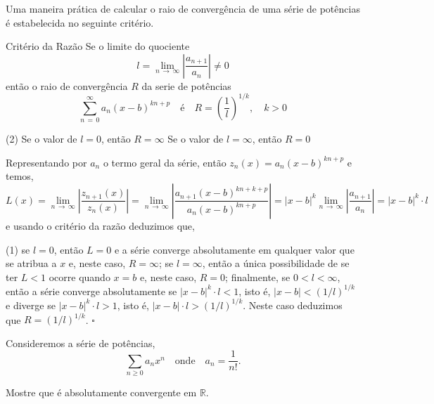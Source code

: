 Uma maneira prática de calcular o raio de convergência de uma série de potências é estabelecida no 
seguinte critério.

\begin{theoc}{Critério da Razão}{}
Se o limite do quociente
\begin{equation*}
l=\lim_{n\, \to\, \infty}\left|\dfrac{a_{n+1}}{a_{n}}\right| \neq 0 
\end{equation*} 
então o raio de convergência \(R\) da serie de potências 
\begin{equation*}
  \sum_{n\, =\, 0}^{\infty}a_{n}(x-b)^{kn+p} \quad\text{é}\quad  R=\left(\dfrac{1}{l}\right)^{1/k}, \quad k >0
\end{equation*}
\begin{tasks}[label=(\alph*),item-indent=3em,label-width=2em,ref=(\alph*)](2)
  \task  Se o valor de \(l=0\), então \(R=\infty\)
  \task Se o valor de \(l = \infty\), então \(R = 0\)
\end{tasks}
\end{theoc}

\begin{prvc}{}{}
Representando por \(a_{n}\) o termo geral da série, então \(z_{n}(x)=a_{n}(x-b)^{kn+p}\) e temos,
\begin{equation*}
L(x)=\lim_{n\, \to\, \infty}\left| \dfrac{z_{n+1}(x)}{z_{n}(x)}\right|=
\lim_{n\, \to \, \infty}\left|\dfrac{a_{n+1}(x-b)^{kn+k+p}}{a_{n}(x-b)^{kn+p}}\right| 
=|x-b|^{k}\lim_{n\, \to \, \infty}\left|\dfrac{a_{n+1}}{a_{n}}\right|=|x-b|^{k} \cdot l 
\end{equation*}
e usando o critério da razão deduzimos que,
\begin{tasks}[label=(\alph*),item-indent=3em,label-width=2em,ref=(\alph*)](1)
\task se \(l=0\), então \(L=0\) e a série converge absolutamente em
qualquer valor que se atribua a \(x\) e, neste caso, \(R= \infty\); 
\task se \(l=\infty\), então a única possibilidade  de se ter \(L < 1\) ocorre quando \(x=b\) e, 
neste caso, \(R=0\); 
\task finalmente, se \(0 < l < \infty\), então a série converge absolutamente se 
\(|x-b|^{k} \cdot l < 1\), isto é, \(|x-b| < (1/l)^{1/k}\) e diverge se 
\(|x-b|^{k} \cdot l > 1\), isto é, \(|x-b| \cdot  l > (1/l)^{1/k}\). 
Neste caso deduzimos que \(R = (1/l)^{1/k}\). \hfill \(\square\)
\end{tasks}
\end{prvc}

\begin{exer} Consideremos a série de potências,
\begin{equation*}
\sum_{n\geq 0}a_nx^n \quad  \text{onde} \quad a_n=\dfrac{1}{n!}. 
\end{equation*}
  
  Mostre que é absolutamente convergente em $\mathbb{R}$.
\end{exer}

